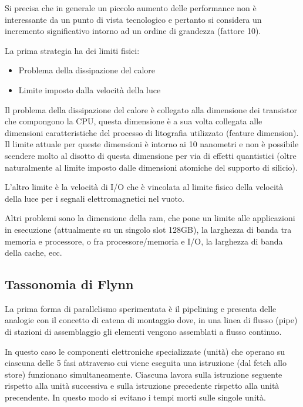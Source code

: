 \documentclass[italian,]{article}
\providecommand{\tightlist}{%
  \setlength{\itemsep}{0pt}\setlength{\parskip}{0pt}}
\begin{document}
Si precisa che in generale un piccolo aumento delle performance non è
interessante da un punto di vista tecnologico e pertanto si considera un
incremento significativo intorno ad un ordine di grandezza (fattore 10).

La prima strategia ha dei limiti fisici:

\begin{itemize}
\tightlist
\item
  Problema della dissipazione del calore
\item
  Limite imposto dalla velocità della luce
\end{itemize}

Il problema della dissipazione del calore è collegato alla dimensione
dei transistor che compongono la CPU, questa dimensione è a sua volta
collegata alle dimensioni caratteristiche del processo di litografia
utilizzato (feature dimension). Il limite attuale per queste dimensioni
è intorno ai 10 nanometri e non è possibile scendere molto al disotto di
questa dimensione per via di effetti quantistici (oltre naturalmente al
limite imposto dalle dimensioni atomiche del supporto di silicio).

L'altro limite è la velocità di I/O che è vincolata al limite fisico
della velocità della luce per i segnali elettromagnetici nel vuoto.

Altri problemi sono la dimensione della ram, che pone un limite alle
applicazioni in esecuzione (attualmente su un singolo slot 128GB), la
larghezza di banda tra memoria e processore, o fra processore/memoria e
I/O, la larghezza di banda della cache, ecc.

\subsection{Tassonomia di Flynn}\label{tassonomia-di-flynn}

La prima forma di parallelismo sperimentata è il pipelining e presenta
delle analogie con il concetto di catena di montaggio dove, in una linea
di flusso (pipe) di stazioni di assemblaggio gli elementi vengono
assemblati a flusso continuo.

In questo caso le componenti elettroniche specializzate (unità) che
operano su ciascuna delle 5 fasi attraverso cui viene eseguita una
istruzione (dal fetch allo store) funzionano simultaneamente. Ciascuna
lavora sulla istruzione seguente rispetto alla unità successiva e sulla
istruzione precedente rispetto alla unità precendente. In questo modo si
evitano i tempi morti sulle singole unità.
\end{document}
